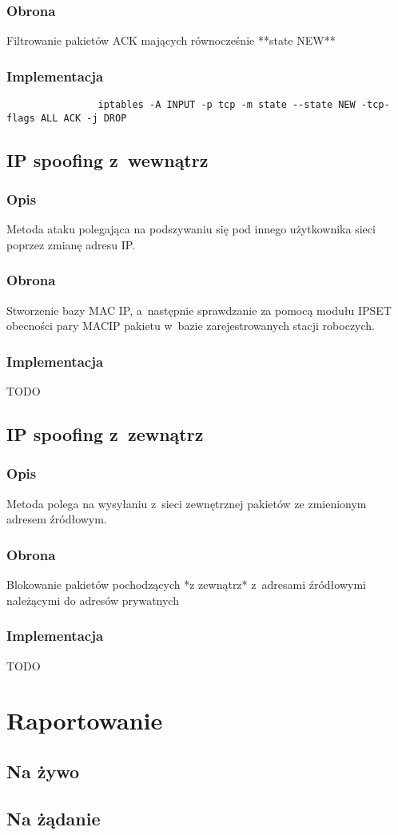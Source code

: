 \documentclass[a4paper,10pt]{article}
\begin{document}
		\subsubsection{Obrona}
			Filtrowanie pakietów ACK mających równocześnie **state NEW**
		\subsubsection{Implementacja}
			\begin{verbatim}
				iptables -A INPUT -p tcp -m state --state NEW -tcp-flags ALL ACK -j DROP
			\end{verbatim}
	\subsection{IP spoofing z~wewnątrz}
		\subsubsection{Opis}
			Metoda ataku polegająca na podszywaniu się pod innego użytkownika sieci poprzez zmianę adresu IP.
		\subsubsection{Obrona}
			Stworzenie bazy MAC \dywiz IP, a~następnie sprawdzanie za pomocą modułu IPSET obecności pary MAC\dywiz IP pakietu w~bazie zarejestrowanych stacji roboczych.
		\subsubsection{Implementacja}
			TODO
	\subsection{IP spoofing z~zewnątrz}
		\subsubsection{Opis}
			Metoda polega na wysyłaniu z~sieci zewnętrznej pakietów ze zmienionym adresem źródłowym.
		\subsubsection{Obrona}
			Blokowanie pakietów pochodzących *z zewnątrz* z~adresami źródłowymi należącymi do adresów prywatnych
		\subsubsection{Implementacja}
			TODO
\section{Raportowanie}
	\subsection{Na żywo}
	\subsection{Na żądanie}
\end{document}
